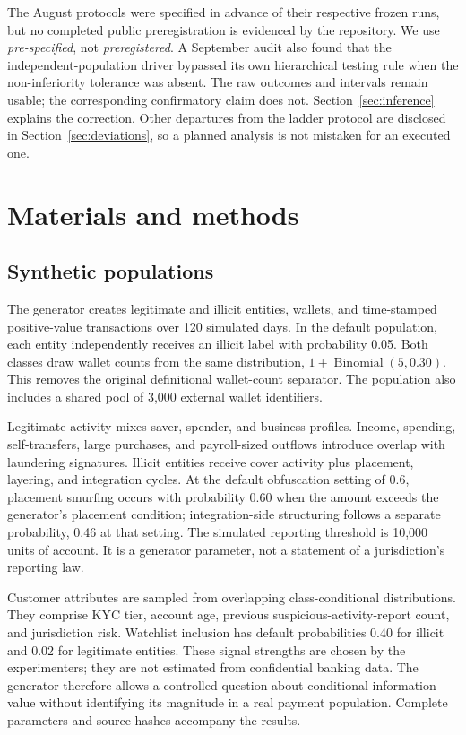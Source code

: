 \documentclass[11pt,a4paper]{article}
\begin{document}
The August protocols were specified in advance of their respective frozen runs, but no completed public preregistration is evidenced by the repository. We use \emph{pre-specified}, not \emph{preregistered}. A September audit also found that the independent-population driver bypassed its own hierarchical testing rule when the non-inferiority tolerance was absent. The raw outcomes and intervals remain usable; the corresponding confirmatory claim does not. Section~\ref{sec:inference} explains the correction. Other departures from the ladder protocol are disclosed in Section~\ref{sec:deviations}, so a planned analysis is not mistaken for an executed one.

\section{Materials and methods}
\subsection{Synthetic populations}
The generator creates legitimate and illicit entities, wallets, and time-stamped positive-value transactions over 120 simulated days. In the default population, each entity independently receives an illicit label with probability 0.05. Both classes draw wallet counts from the same distribution, $1+\operatorname{Binomial}(5,0.30)$. This removes the original definitional wallet-count separator. The population also includes a shared pool of 3,000 external wallet identifiers.

Legitimate activity mixes saver, spender, and business profiles. Income, spending, self-transfers, large purchases, and payroll-sized outflows introduce overlap with laundering signatures. Illicit entities receive cover activity plus placement, layering, and integration cycles. At the default obfuscation setting of 0.6, placement smurfing occurs with probability 0.60 when the amount exceeds the generator's placement condition; integration-side structuring follows a separate probability, 0.46 at that setting. The simulated reporting threshold is 10,000 units of account. It is a generator parameter, not a statement of a jurisdiction's reporting law.

Customer attributes are sampled from overlapping class-conditional distributions. They comprise KYC tier, account age, previous suspicious-activity-report count, and jurisdiction risk. Watchlist inclusion has default probabilities 0.40 for illicit and 0.02 for legitimate entities. These signal strengths are chosen by the experimenters; they are not estimated from confidential banking data. The generator therefore allows a controlled question about conditional information value without identifying its magnitude in a real payment population. Complete parameters and source hashes accompany the results.
\end{document}
